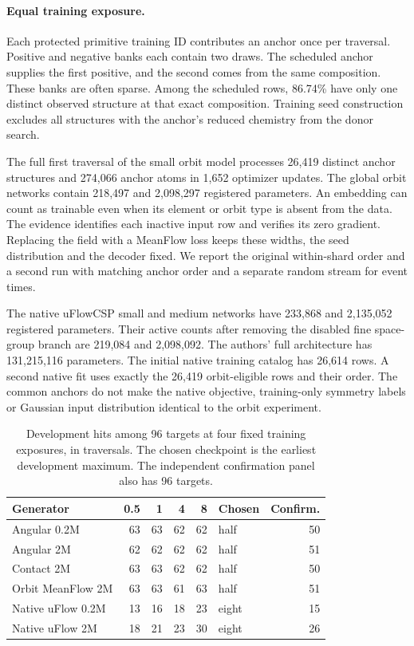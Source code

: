 \paragraph{Equal training exposure.} Each protected primitive training ID contributes an anchor once per traversal. Positive and negative banks each contain two draws. The scheduled anchor supplies the first positive, and the second comes from the same composition. These banks are often sparse. Among the scheduled rows, 86.74\% have only one distinct observed structure at that exact composition. Training seed construction excludes all structures with the anchor's reduced chemistry from the donor search.

The full first traversal of the small orbit model processes 26,419 distinct anchor structures and 274,066 anchor atoms in 1,652 optimizer updates. The global orbit networks contain 218,497 and 2,098,297 registered parameters. An embedding can count as trainable even when its element or orbit type is absent from the data. The evidence identifies each inactive input row and verifies its zero gradient. Replacing the field with a MeanFlow loss keeps these widths, the seed distribution and the decoder fixed. We report the original within-shard order and a second run with matching anchor order and a separate random stream for event times.

The native uFlowCSP small and medium networks have 233,868 and 2,135,052 registered parameters. Their active counts after removing the disabled fine space-group branch are 219,084 and 2,098,092. The authors' full architecture has 131,215,116 parameters. The initial native training catalog has 26,614 rows. A second native fit uses exactly the 26,419 orbit-eligible rows and their order. The common anchors do not make the native objective, training-only symmetry labels or Gaussian input distribution identical to the orbit experiment.

\begin{table}[!htbp]\centering\small\setlength{\tabcolsep}{3.6pt}
\caption{Development hits among 96 targets at four fixed training exposures, in traversals. The chosen checkpoint is the earliest development maximum. The independent confirmation panel also has 96 targets.}
\begin{tabular}{lrrrrlr}\hline
Generator & 0.5 & 1 & 4 & 8 & Chosen & Confirm.\\\hline
Angular 0.2M & 63 & 63 & 62 & 62 & half & 50\\
Angular 2M & 62 & 62 & 62 & 62 & half & 51\\
Contact 2M & 63 & 63 & 62 & 62 & half & 50\\
Orbit MeanFlow 2M & 63 & 63 & 61 & 63 & half & 51\\
Native uFlow 0.2M & 13 & 16 & 18 & 23 & eight & 15\\
Native uFlow 2M & 18 & 21 & 23 & 30 & eight & 26\\
\hline\end{tabular}\end{table}

